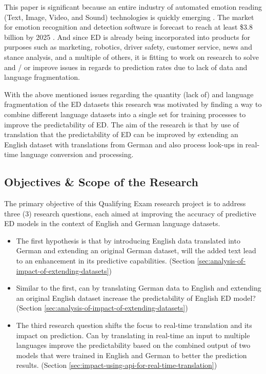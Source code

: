 \documentclass[11pt]{article}
\begin{document}
This paper is significant because an entire industry of automated emotion reading (Text, Image, Video, and Sound) technologies is quickly emerging \cite{ACLU-ED-Data, ACLU-THE-DAWN-OF-ROBOT-SURVEILLANCE}. The market for emotion recognition and detection software is forecast to reach at least \$3.8 billion by 2025 \cite{ACLU-ED-Data, ACLU-THE-DAWN-OF-ROBOT-SURVEILLANCE}. And since ED is already being incorporated into products for purposes such as marketing, robotics, driver safety, customer service, news and stance analysis, and a multiple of others, it is fitting to work on research to solve and / or improve issues in regards to prediction rates due to lack of data and language fragmentation.

With the above mentioned issues regarding the quantity (lack of) and language fragmentation of the ED datasets this research was motivated by finding a way to combine different language datasets into a single set for training processes to improve the predictability of ED. The aim of the research is that by use of translation that the predictability of ED can be improved by extending an English dataset with translations from German and also process look-ups in real-time language conversion and processing.

\subsection{Objectives \& Scope of the Research}

The primary objective of this Qualifying Exam research project is to address three (3) research questions, each aimed at improving the accuracy of predictive ED models in the context of English and German language datasets.

\begin{itemize}
\item The first hypothesis is that by introducing English data translated into German and extending an original German dataset, will the added text lead to an enhancement in its predictive capabilities. (Section \ref{sec:analysis-of-impact-of-extending-datasets})
\item Similar to the first, can by translating German data to English and extending an original English dataset increase the predictability of English ED model? (Section \ref{sec:analysis-of-impact-of-extending-datasets})
\item The third research question shifts the focus to real-time translation and its impact on prediction. Can by translating in real-time an input to multiple languages improve the predictability based on the combined output of two models that were trained in English and German to better the prediction results. (Section \ref{sec:impact-using-api-for-real-time-translation})
\end{itemize}
\end{document}
